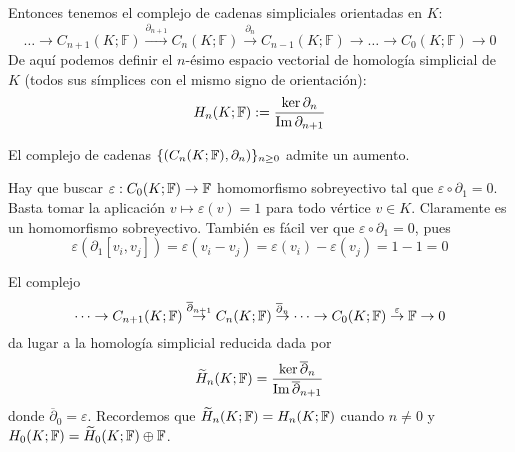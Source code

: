 \documentclass[HS.tex]{subfiles}
\begin{document}
Entonces tenemos el complejo de cadenas simpliciales orientadas en $K$:
\[ \dots \to C_{n+1}(K; \mathbb{F}) \xrightarrow{\partial_{n+1}} C_n(K; \mathbb{F}) \xrightarrow{\partial_n} C_{n-1}(K; \mathbb{F}) \to \dots \to C_0(K; \mathbb{F}) \to 0 \]
De aquí podemos definir el $n$-ésimo espacio vectorial de homología simplicial de $K$ (todos sus símplices con el mismo signo de orientación):
\[ H_n(K; \mathbb{F}) := \frac{\ker \partial_n}{\operatorname{Im} \partial_{n+1}}\]


\begin{prop}
El complejo de cadenas $\{(C_n(K;\mathbb{F}),\partial_n)\}_{n\geq 0}$ admite un aumento.
\end{prop}

\begin{dem}
Hay que buscar $\varepsilon:C_0(K;\mathbb{F})\to\mathbb{F}$ homomorfismo sobreyectivo tal que $\varepsilon\circ\partial_1=0$. Basta tomar la aplicación $v\mapsto \varepsilon(v)=1$ para todo vértice $v\in K$. Claramente es un homomorfismo sobreyectivo. También es fácil ver que $\varepsilon\circ\partial_1=0$, pues
\[
\varepsilon(\partial_1[v_i,v_j])=\varepsilon(v_i-v_j)=\varepsilon(v_i)-\varepsilon(v_j)=1-1=0
\]
\QED
\end{dem}
El complejo
\[
\cdots\to C_{n+1}(K;\mathbb{F})\overset{\overline{\partial}_{n+1}}{\to}C_n(K;\mathbb{F})\overset{\overline{\partial}_n}{\to}\cdots\to C_0(K;\mathbb{F})\overset{\varepsilon}{\to}\mathbb{F}\to 0
\]
da lugar a la homología simplicial reducida dada por 
\[
\widetilde{H}_n(K;\mathbb{F})=\frac{\ker\overline{\partial}_n}{\operatorname{Im}\overline{\partial}_{n+1}}
\]
donde $\overline{\partial}_0=\varepsilon$. Recordemos que $\widetilde{H}_n(K;\mathbb{F})=H_n(K;\mathbb{F})$ cuando $n\neq 0$ y $H_0(K;\mathbb{F})=\widetilde{H}_0(K;\mathbb{F})\oplus\mathbb{F}$.
\end{document}
